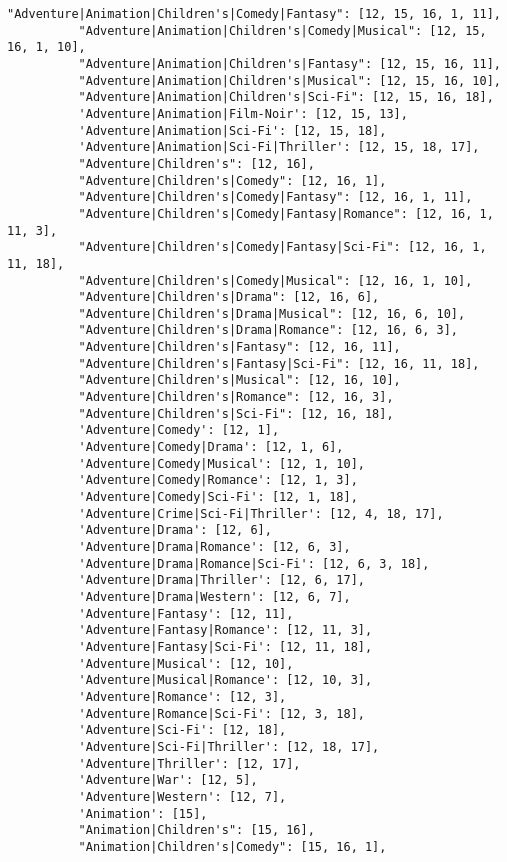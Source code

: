 \documentclass[11pt]{article}
\begin{document}
\begin{Verbatim}[commandchars=\\\{\}]
          "Adventure|Animation|Children's|Comedy|Fantasy": [12, 15, 16, 1, 11],
          "Adventure|Animation|Children's|Comedy|Musical": [12, 15, 16, 1, 10],
          "Adventure|Animation|Children's|Fantasy": [12, 15, 16, 11],
          "Adventure|Animation|Children's|Musical": [12, 15, 16, 10],
          "Adventure|Animation|Children's|Sci-Fi": [12, 15, 16, 18],
          'Adventure|Animation|Film-Noir': [12, 15, 13],
          'Adventure|Animation|Sci-Fi': [12, 15, 18],
          'Adventure|Animation|Sci-Fi|Thriller': [12, 15, 18, 17],
          "Adventure|Children's": [12, 16],
          "Adventure|Children's|Comedy": [12, 16, 1],
          "Adventure|Children's|Comedy|Fantasy": [12, 16, 1, 11],
          "Adventure|Children's|Comedy|Fantasy|Romance": [12, 16, 1, 11, 3],
          "Adventure|Children's|Comedy|Fantasy|Sci-Fi": [12, 16, 1, 11, 18],
          "Adventure|Children's|Comedy|Musical": [12, 16, 1, 10],
          "Adventure|Children's|Drama": [12, 16, 6],
          "Adventure|Children's|Drama|Musical": [12, 16, 6, 10],
          "Adventure|Children's|Drama|Romance": [12, 16, 6, 3],
          "Adventure|Children's|Fantasy": [12, 16, 11],
          "Adventure|Children's|Fantasy|Sci-Fi": [12, 16, 11, 18],
          "Adventure|Children's|Musical": [12, 16, 10],
          "Adventure|Children's|Romance": [12, 16, 3],
          "Adventure|Children's|Sci-Fi": [12, 16, 18],
          'Adventure|Comedy': [12, 1],
          'Adventure|Comedy|Drama': [12, 1, 6],
          'Adventure|Comedy|Musical': [12, 1, 10],
          'Adventure|Comedy|Romance': [12, 1, 3],
          'Adventure|Comedy|Sci-Fi': [12, 1, 18],
          'Adventure|Crime|Sci-Fi|Thriller': [12, 4, 18, 17],
          'Adventure|Drama': [12, 6],
          'Adventure|Drama|Romance': [12, 6, 3],
          'Adventure|Drama|Romance|Sci-Fi': [12, 6, 3, 18],
          'Adventure|Drama|Thriller': [12, 6, 17],
          'Adventure|Drama|Western': [12, 6, 7],
          'Adventure|Fantasy': [12, 11],
          'Adventure|Fantasy|Romance': [12, 11, 3],
          'Adventure|Fantasy|Sci-Fi': [12, 11, 18],
          'Adventure|Musical': [12, 10],
          'Adventure|Musical|Romance': [12, 10, 3],
          'Adventure|Romance': [12, 3],
          'Adventure|Romance|Sci-Fi': [12, 3, 18],
          'Adventure|Sci-Fi': [12, 18],
          'Adventure|Sci-Fi|Thriller': [12, 18, 17],
          'Adventure|Thriller': [12, 17],
          'Adventure|War': [12, 5],
          'Adventure|Western': [12, 7],
          'Animation': [15],
          "Animation|Children's": [15, 16],
          "Animation|Children's|Comedy": [15, 16, 1],

\end{Verbatim}
\end{document}
